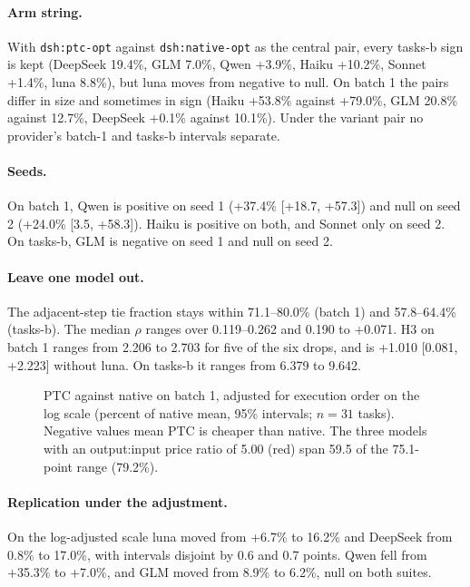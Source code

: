 \documentclass[10pt]{article}
\newcommand*{\mi}{\textminus}   %
\begin{document}
\begin{appendices}
\paragraph{Arm string.} With \texttt{dsh:ptc-opt} against \texttt{dsh:native-opt} as the central
pair, every tasks-b sign is kept (DeepSeek \mi{}19.4\%, GLM \mi{}7.0\%, Qwen +3.9\%, Haiku +10.2\%,
Sonnet +1.4\%, luna \mi{}8.8\%), but luna moves from negative to null. On batch 1 the pairs differ in
size and sometimes in sign (Haiku +53.8\% against +79.0\%, GLM \mi{}20.8\% against \mi{}12.7\%,
DeepSeek +0.1\% against \mi{}10.1\%). Under the variant pair no provider's batch-1 and tasks-b
intervals separate.

\paragraph{Seeds.} On batch 1, Qwen is positive on seed 1 (+37.4\% [+18.7, +57.3]) and null on seed 2
(+24.0\% [\mi{}3.5, +58.3]). Haiku is positive on both, and Sonnet only on seed 2. On tasks-b, GLM is
negative on seed 1 and null on seed 2.

\paragraph{Leave one model out.} The adjacent-step tie fraction stays within 71.1--80.0\% (batch 1)
and 57.8--64.4\% (tasks-b). The median $\rho$ ranges over 0.119--0.262 and \mi{}0.190 to +0.071. H3 on
batch 1 ranges from 2.206 to 2.703 for five of the six drops, and is +1.010 [\mi{}0.081, +2.223]
without luna. On tasks-b it ranges from 6.379 to 9.642.

\begin{figure}[htbp]\centering
\caption{PTC against native on batch 1, adjusted for execution order on the log scale (percent of
native mean, 95\% intervals; $n = 31$ tasks). Negative values mean PTC is cheaper than native. The three models with an output:input price ratio of 5.00 (red) span
59.5 of the 75.1-point range (79.2\%).}\label{fig:penalty}\end{figure}

\paragraph{Replication under the adjustment.} On the log-adjusted scale luna moved from +6.7\% to
\mi{}16.2\% and DeepSeek from \mi{}0.8\% to \mi{}17.0\%, with intervals disjoint by 0.6 and 0.7 points.
Qwen fell from +35.3\% to +7.0\%, and GLM moved from \mi{}8.9\% to \mi{}6.2\%, null on both suites.


\end{appendices}
\end{document}
